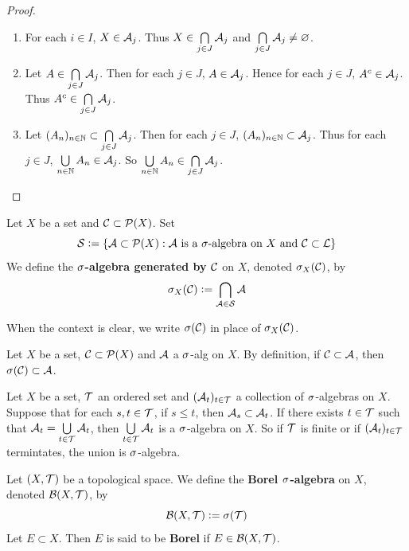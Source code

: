 \documentclass{book}
\begin{document}
	\begin{proof}\
		\begin{enumerate}
			\item For each $i \in I$, $X \in \mathcal{A}_j$. Thus $X \in \bigcap\limits_{j \in J}\mathcal{A}_j$ and $\bigcap\limits_{j \in J}\mathcal{A}_j \neq \varnothing$.
			\item Let $A \in \bigcap\limits_{j \in J}\mathcal{A}_j$. Then for each $j \in J$, $A \in \mathcal{A}_j$. Hence for each $j \in J$, $A^c \in \mathcal{A}_j$. Thus $A^c \in \bigcap\limits_{j \in J}\mathcal{A}_j$. 
			\item Let $(A_n)_{n \in \mathbb{N}} \subset \bigcap\limits_{j \in J}\mathcal{A}_j$. Then for each $j \in J$, $(A_n)_{n \in \mathbb{N}} \subset \mathcal{A}_j$. Thus for each $j \in J$, $\bigcup\limits_{n \in \mathbb{N}}A_n \in \mathcal{A}_j$. So $\bigcup\limits_{n \in \mathbb{N}}A_n \in \bigcap\limits_{j \in J}\mathcal{A}_j$.
		\end{enumerate}
	\end{proof}
	
	\begin{defn}  
		Let $X$ be a set and $\mathcal{C} \subset \mathcal{P}(X)$. Set 
		$$\mathcal{S} \vcentcolon= \{\mathcal{A} \subset \mathcal{P}(X): \mathcal{A} \text{ is a }\sigma\text{-algebra on }X \text{ and } \mathcal{C} \subset \mathcal{L}\}$$ 
		We define the \textbf{$\sigma$-algebra generated by $\mathcal{C}$} on $X$, denoted $\sigma_X(\mathcal{C})$, by $$\sigma_X(\mathcal{C}) \vcentcolon= \bigcap_{\mathcal{A} \in \mathcal{S}} \mathcal{A} $$
	\end{defn}

	\begin{note}
		When the context is clear, we write $\sigma(\mathcal{C})$ in place of $\sigma_X(\mathcal{C})$.
	\end{note}
	
	\begin{note}
		Let $X$ be a set, $\mathcal{C} \subset \mathcal{P}(X)$ and $\mathcal{A}$ a $\sigma$-alg on $X$. By definition, if $\mathcal{C} \subset \mathcal{A}$, then $\sigma(\mathcal{C}) \subset \mathcal{A}$.
	\end{note}
	
	\begin{note}
		Let $X$ be a set, $\mathcal{T}$ an ordered set and $(\mathcal{A}_t)_{t\in \mathcal{T}}$ a collection of $\sigma$-algebras on $X$. Suppose that for each $s,t \in \mathcal{T}$, if $s \leq t$, then $\mathcal{A}_s \subset \mathcal{A}_t$. If there exists $t \in \mathcal{T}$ such that $\mathcal{A}_t = \bigcup\limits_{t \in \mathcal{T}}\mathcal{A}_t$, then $\bigcup\limits_{t \in \mathcal{T}}\mathcal{A}_t$ is a $\sigma$-algebra on $X$. So if $\mathcal{T}$ is finite or if $(\mathcal{A}_t)_{t \in \mathcal{T}}$ termintates, the union is $\sigma$-algebra. \tcr{rework, FINISH!!!}
	\end{note}
	
	\begin{defn}   
		Let $(X,\mathcal{T})$ be a topological space. We define the \textbf{Borel $\sigma$-algebra} on $X$, denoted $\mathcal{B}(X, \mathcal{T})$, by 
		$$\mathcal{B}(X, \mathcal{T}) \vcentcolon= \sigma(\mathcal{T})$$  
		Let $E \subset X$. Then $E$ is said to be \textbf{Borel} if $E \in \mathcal{B}(X, \mathcal{T})$.
	\end{defn}
\end{document}
